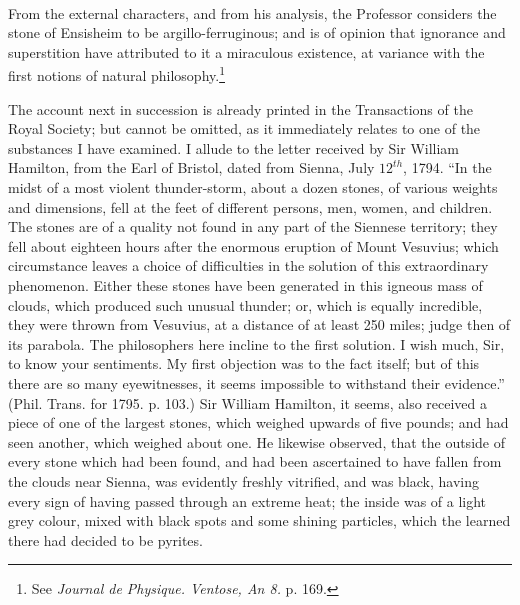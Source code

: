 \documentclass[a4paper, 12pt, oneside]{article}
\begin{document}
\paragraph{}
From the external characters, and from his analysis, the Professor considers the stone of Ensisheim to be argillo-ferruginous; and is of opinion that ignorance and superstition have attributed to it a miraculous existence, at variance with the first notions of natural philosophy.\footnote{See \emph{Journal de Physique. Ventose, An 8.} p. 169.}

The account next in succession is already printed in the Transactions of the Royal Society; but cannot be omitted, as it immediately relates to one of the substances I have examined. I allude to the letter received by Sir William Hamilton, from the Earl of Bristol, dated from Sienna, July $12^{th}$, 1794. ``In the midst of a most violent thunder-storm, about a dozen stones, of various weights and dimensions, fell at the feet of different persons, men, women, and children. The stones are of a quality not found in any part of the Siennese territory; they fell about eighteen hours after the enormous eruption of Mount Vesuvius; which circumstance leaves a choice of difficulties in the solution of this extraordinary phenomenon. Either these stones have been generated in this igneous mass of clouds, which produced such unusual thunder; or, which is equally incredible, they were thrown from Vesuvius, at a distance of at least 250 miles; judge then of its parabola. The philosophers here incline to the first solution. I wish much, Sir, to know your sentiments. My first objection was to the fact itself; but of this there are so many eyewitnesses, it seems impossible to withstand their evidence.'' (Phil. Trans. for 1795. p. 103.) Sir William Hamilton, it seems, also received a piece of one of the largest stones, which weighed upwards of five pounds; and had seen another, which weighed about one. He likewise observed, that the outside of every stone which had been found, and had been ascertained to have fallen from the clouds near Sienna, was evidently freshly vitrified, and was black, having every sign of having passed through an extreme heat; the inside was of a light grey colour, mixed with black spots and some shining particles, which the learned there had decided to be pyrites.
\end{document}
